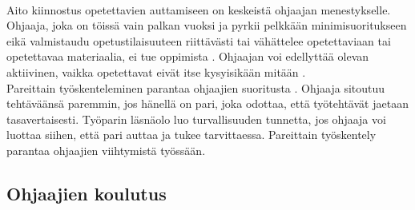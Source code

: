 \documentclass[finnish]{tktltiki2}
\theoremstyle{definition}
\theoremstyle{remark}
\begin{document}
\\
Aito kiinnostus opetettavien auttamiseen on keskeistä ohjaajan menestykselle. Ohjaaja, joka on töissä vain palkan vuoksi ja pyrkii pelkkään minimisuoritukseen eikä valmistaudu opetustilaisuuteen riittävästi tai vähättelee opetettaviaan tai opetettavaa materiaalia, ei tue oppimista \cite{Richards00}. Ohjaajan voi edellyttää olevan aktiivinen, vaikka opetettavat eivät itse kysyisikään mitään \cite{Vikberg}.
\\
Pareittain työskenteleminen parantaa ohjaajien suoritusta \cite{Patitsas12_3}. Ohjaaja sitoutuu tehtäväänsä paremmin, jos hänellä on pari, joka odottaa, että työtehtävät jaetaan tasavertaisesti. Työparin läsnäolo luo turvallisuuden tunnetta, jos ohjaaja voi luottaa siihen, että pari auttaa ja tukee tarvittaessa. Pareittain työskentely parantaa ohjaajien viihtymistä työssään.


\subsection{Ohjaajien koulutus}
\end{document}
